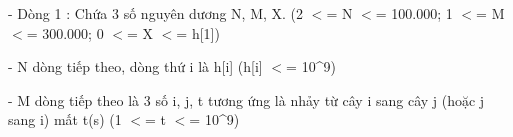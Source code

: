 - Dòng 1 : Chứa 3 số nguyên dương N, M, X. (2 $<$= N $<$= 100.000; 1 $<$= M $<$= 300.000; 0 $<$= X $<$= h[1])

- N dòng tiếp theo, dòng thứ i là h[i] (h[i] $<$= 10\textasciicircum9)

- M dòng tiếp theo là 3 số i, j, t tương ứng là nhảy từ cây i sang cây j (hoặc j sang i) mất t(s) (1 $<$= t $<$= 10\textasciicircum9)